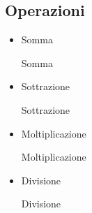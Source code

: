 \subsection{Operazioni}
    \begin{itemize}
        \item {Somma
            \begin{center}
                Somma
            \end{center}
        }
        \item {Sottrazione
            \begin{center}
                Sottrazione
            \end{center}
        }
        \item {Moltiplicazione
            \begin{center}
                Moltiplicazione
            \end{center}
        }
        \item {Divisione
            \begin{center}
                Divisione
            \end{center}
        }
    \end{itemize}

\lipsum

